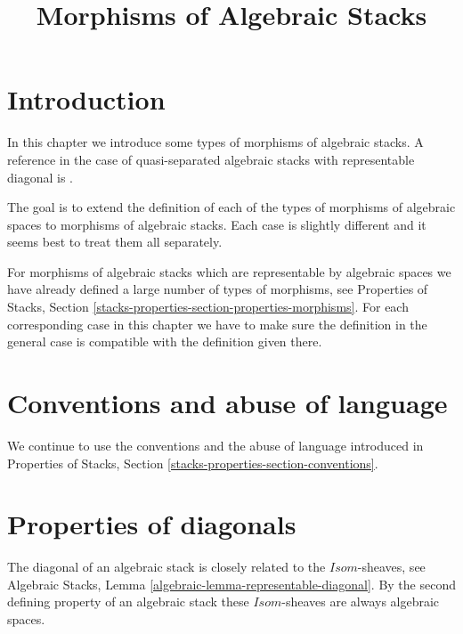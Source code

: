 \documentclass{stacks-project}
\theoremstyle{plain}
\theoremstyle{definition}
\theoremstyle{remark}
\numberwithin{equation}{subsection}
\begin{document}
\title{Morphisms of Algebraic Stacks}


\maketitle

\label{section-phantom}

\tableofcontents

\section{Introduction}
\label{section-introduction}

\noindent
In this chapter we introduce some types of morphisms of algebraic stacks.
A reference in the case of quasi-separated algebraic stacks with representable
diagonal is \cite{LM-B}.

\medskip\noindent
The goal is to extend the definition of each of the types of morphisms of
algebraic spaces to morphisms of algebraic stacks. Each case is slightly
different and it seems best to treat them all separately.

\medskip\noindent
For morphisms of algebraic stacks which are representable
by algebraic spaces we have already defined a large number of types of
morphisms, see
Properties of Stacks,
Section \ref{stacks-properties-section-properties-morphisms}.
For each corresponding case in this chapter
we have to make sure the definition in the general
case is compatible with the definition given there.




\section{Conventions and abuse of language}
\label{section-conventions}

\noindent
We continue to use the conventions and the abuse of language
introduced in
Properties of Stacks, Section \ref{stacks-properties-section-conventions}.




\section{Properties of diagonals}
\label{section-diagonals}

\noindent
The diagonal of an algebraic stack is closely related to the
$\mathit{Isom}$-sheaves, see
Algebraic Stacks, Lemma \ref{algebraic-lemma-representable-diagonal}.
By the second defining property of an algebraic stack these
$\mathit{Isom}$-sheaves are always algebraic spaces.
\end{document}
